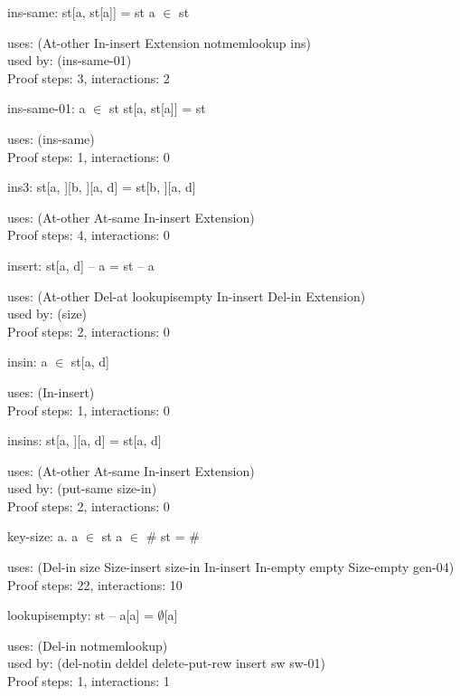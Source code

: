 \documentclass[a4paper]{article}
\begin{document}
\medskip

ins-same: 
 \Fol st[a, st[a]] = st \Equiv a $\in$ st


uses: (At-other In-insert Extension notmemlookup ins)\\
used by: (ins-same-01)\\
Proof steps: 3, interactions: 2

\medskip

ins-same-01: 
 \Fol a $\in$ st \Imp st[a, st[a]] = st


uses: (ins-same)\\
Proof steps: 1, interactions: 0

\medskip

ins3: 
 \Fol st[a, ][b, ][a, d] = st[b, ][a, d]


uses: (At-other At-same In-insert Extension)\\
Proof steps: 4, interactions: 0

\medskip

insert: 
 \Fol st[a, d] -- a = st -- a


uses: (At-other Del-at lookupisempty In-insert Del-in Extension)\\
used by: (size)\\
Proof steps: 2, interactions: 0

\medskip

insin: 
 \Fol a $\in$ st[a, d]


uses: (In-insert)\\
Proof steps: 1, interactions: 0

\medskip

insins: 
 \Fol st[a, ][a, d] = st[a, d]


uses: (At-other At-same In-insert Extension)\\
used by: (put-same size-in)\\
Proof steps: 2, interactions: 0

\medskip

key-size: 
\All a. a $\in$ st \Equiv a $\in$ 
 \Fol \# st = \# 


uses: (Del-in size Size-insert size-in In-insert In-empty empty
       Size-empty gen-04)\\
Proof steps: 22, interactions: 10

\medskip

lookupisempty: 
 \Fol st -- a[a] = $\emptyset$[a]


uses: (Del-in notmemlookup)\\
used by: (del-notin deldel delete-put-rew insert sw sw-01)\\
Proof steps: 1, interactions: 1
\end{document}
